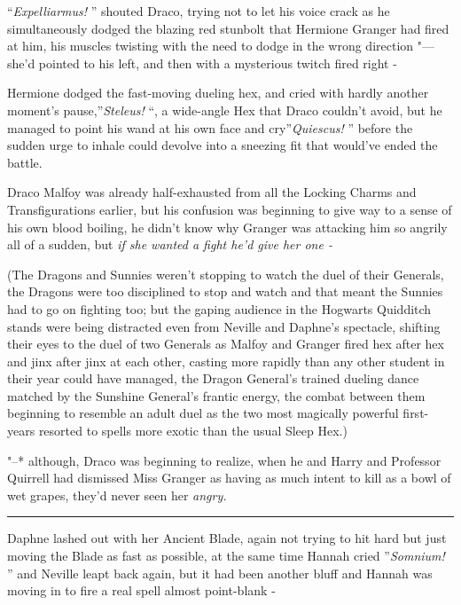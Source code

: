 ``\emph{Expelliarmus!} '' shouted Draco, trying not to let his voice crack
as he simultaneously dodged the blazing red stunbolt that Hermione
Granger had fired at him, his muscles twisting with the need to dodge in
the wrong direction "--- she'd pointed to his left, and then with a
mysterious twitch fired right -

Hermione dodged the fast-moving dueling hex, and cried with hardly
another moment's pause,''\emph{Steleus!} ``, a wide-angle Hex that Draco
couldn't avoid, but he managed to point his wand at his own face and
cry''\emph{Quiescus!} '' before the sudden urge to inhale could devolve
into a sneezing fit that would've ended the battle.

Draco Malfoy was already half-exhausted from all the Locking Charms and
Transfigurations earlier, but his confusion was beginning to give way to
a sense of his own blood boiling, he didn't know why Granger was
attacking him so angrily all of a sudden, but \emph{if she wanted a
fight he'd give her one -}

(The Dragons and Sunnies weren't stopping to watch the duel of their
Generals, the Dragons were too disciplined to stop and watch and that
meant the Sunnies had to go on fighting too; but the gaping audience in
the Hogwarts Quidditch stands were being distracted even from Neville
and Daphne's spectacle, shifting their eyes to the duel of two Generals
as Malfoy and Granger fired hex after hex and jinx after jinx at each
other, casting more rapidly than any other student in their year could
have managed, the Dragon General's trained dueling dance matched by the
Sunshine General's frantic energy, the combat between them beginning to
resemble an adult duel as the two most magically powerful first-years
resorted to spells more exotic than the usual Sleep Hex.)

"--* although, Draco was beginning to realize, when he and Harry and
Professor Quirrell had dismissed Miss Granger as having as much intent
to kill as a bowl of wet grapes, they'd never seen her \emph{angry.}

\begin{center}\rule{3in}{0.4pt}\end{center}

Daphne lashed out with her Ancient Blade, again not trying to hit hard
but just moving the Blade as fast as possible, at the same time Hannah
cried ''\emph{Somnium!} '' and Neville leapt back again, but it had been
another bluff and Hannah was moving in to fire a real spell almost
point-blank -


